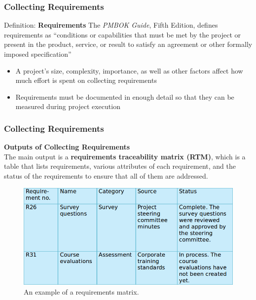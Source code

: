 \documentclass[aspectratio=169]{beamer}
\begin{document}
\begin{frame}
\frametitle{Collecting Requirements}
\vspace{0.5cm}
\begin{block}{Definition: \textbf{Requirements}}
The \textit{PMBOK Guide}, Fifth Edition, defines requirements as “conditions or capabilities that must be met by the project or present in the product, service, or result to satisfy an agreement or other formally imposed specification”
\end{block}
\vspace{0.3cm}
\begin{itemize}
\item A project’s size, complexity, importance, as well as other factors affect how much effort is spent on collecting requirements
\vspace{0.5cm}
\item Requirements must be documented in enough detail so that they can be measured during project execution
\end{itemize}
\end{frame}


\begin{frame}
\frametitle{Collecting Requirements}
\textbf{Outputs of Collecting Requirements}\\
\vspace{0.5cm}
The main output is a \textbf{requirements traceability matrix (RTM)}, which is a table that lists requirements, various attributes of each requirement, and the status of the requirements to ensure that all of them are addressed.
\vspace{0.3cm}
\begin{figure}
\includegraphics[scale=0.35]{requirements_mat}
\caption{An example of a requirements matrix.}
\end{figure}
\end{frame}
\end{document}
